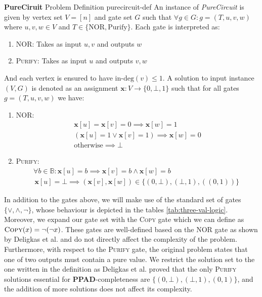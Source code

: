 \begin{definitionbox}{\textbf{PureCiruit} Problem Definition \cite{deligkas_PureCircuitTightInapproximability_2024}}{purecircuit-def}
    An instance of \textit{PureCircuit} is given by vertex set $V= [n]$ and gate set $G$ such that
    $\forall g \in G: g=(T,u,v,w)$ where $u,v,w \in V$ and $T \in \{\text{NOR}, \text{Purify}\}$.
    Each gate is interpreted as:
    \begin{enumerate}
        \item \textsc{NOR}: Takes as input $u,v$ and outputs $w$
        \item \textsc{Purify}: Takes as input $u$ and outputs $v,w$
    \end{enumerate}
    And each vertex is ensured to have $\text{in-deg}(v) \leq 1$.
    A solution to input instance $(V,G)$ is denoted as an assignment $\mathbf{x} : V \to \{0, \bot, 1\}$
    such that for all gates $g = (T,u,v,w)$ we have:
    \begin{enumerate}
        \item \textsc{NOR}:
              \begin{gather*}
                  \mathbf{x}[u] = \mathbf{x}[v] = 0 \implies \mathbf{x}[w] = 1\\
                  (\mathbf{x}[u] =1 \vee \mathbf{x}[v] =1) \implies \mathbf{x}[w] = 0 \\
                  \text{otherwise} \implies \bot
              \end{gather*}

        \item \textsc{Purify}:
              \begin{gather*}
                  \forall b \in \mathbb{B}: \mathbf{x}[u] = b \implies \mathbf{x}[v] = b \wedge \mathbf{x}[w] =  b\\
                  \, \mathbf{x}[u] = \bot \implies (\mathbf{x}[v], \mathbf{x}[w]) \in \{(0, \bot),
                  (\bot, 1), ((0, 1))\}
                  \, \, \end{gather*}
    \end{enumerate}
\end{definitionbox}

In addition to the gates above, we will make use of the standard set of gates $\{\vee, \wedge, \neg\}$,
whose behaviour is depicted in the tables \ref{tab:three-val-logic}.
Moreover, we expand our gate set with the \textsc{Copy} gate which we can define as $\textsc{Copy}(x) = \neg (\neg x)$.
These gates are well-defined based on the \textsc{NOR} gate as shown by Deligkas et al. \cite{deligkas_PureCircuitTightInapproximability_2024}
and do not directly affect the complexity of the problem.
Furthermore, with respect to the \textsc{Purify} gate,
the original problem states that one of two outputs must contain a pure value.
We restrict the solution set to the one written in the definition as
Deligkas et al. \cite{deligkas_PureCircuitTightInapproximability_2024} proved that the only \textsc{Purify} solutions essential
for \textbf{PPAD}-completeness are $\{(0,\bot), (\bot,1), (0,1)\}$, and the addition of more solutions does not affect its complexity.


